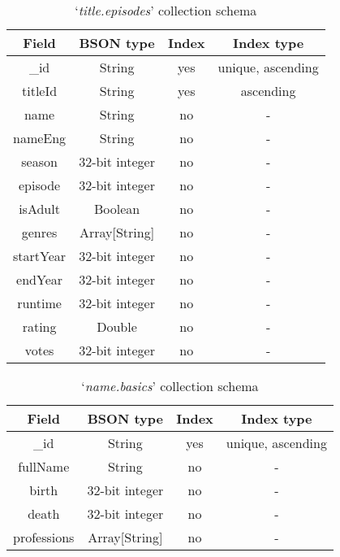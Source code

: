 \begin{table}[H]
	\caption{`\textit{title.episodes}' collection schema}
\begin{center}
	\begin{tabular}{ cccc }
		\hline
		Field & BSON type & Index & Index type \\
		\hline
		\_id & String & yes & unique, ascending \\
		titleId & String & yes & ascending \\
		name & String & no & - \\
		nameEng & String & no & - \\
		season & 32-bit integer & no & - \\
		episode & 32-bit integer & no & - \\
		isAdult & Boolean & no & - \\
		genres & Array[String] & no & - \\
		startYear & 32-bit integer & no & - \\
		endYear & 32-bit integer & no & - \\
		runtime & 32-bit integer & no & - \\
		rating & Double & no & - \\
		votes & 32-bit integer & no & - \\
		\hline
	\end{tabular}
\end{center}
\end{table}

\begin{table}[H]
	\caption{`\textit{name.basics}' collection schema}
	\begin{center}
		\begin{tabular}{ cccc }
			\hline
			Field & BSON type & Index & Index type \\
			\hline
			\_id & String & yes & unique, ascending \\
			fullName & String & no & - \\
			birth & 32-bit integer & no & - \\
			death & 32-bit integer & no & - \\
			professions & Array[String] & no & - \\
			\hline
		\end{tabular}
	\end{center}
\end{table}

